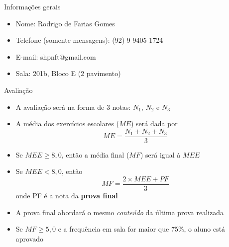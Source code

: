 \documentclass[t,%
brazilian,%
11pt,%
aspectratio=169,%
table%
]{beamer}
\title{\Disciplina}
\author{\Professor}
\date{\Periodo}
\newcommand{\esimo}{\textordmasculine }
\begin{document}
\begin{frame}
    \titlepage
\end{frame}

\begin{frame}{Informações gerais}
    \begin{itemize}
        \item Nome: {\selectfont Rodrigo de Farias Gomes}
        \item Telefone (somente mensagens): (92) 9 9405-1724
        \item E-mail: shpnft@gmail.com
        \item Sala: 201b, Bloco E (2\esimo{} pavimento)
    \end{itemize}
\end{frame}

\begin{frame}{Avaliação}
    \begin{itemize}
        \item A avaliação será na forma de 3 notas: \(N_1\), \(N_2\) e \(N_3\)
        \item A média dos exercícios escolares (\(ME\)) será dada por
            \[
                ME=\frac{N_1+N_2+N_3}{3}
            \]
        \item Se \(MEE \geq 8,0\), então a média final (\(MF\)) será igual à \(MEE\)
        \item Se \(MEE < 8,0\), então
            \[
                MF=\frac{2\times MEE+PF}{3}
            \]
            onde PF é a nota da \textbf{prova final}
        \item A prova final abordará o mesmo \textit{conteúdo} da última prova realizada
        \item Se \(MF \geq 5,0\) e a frequência em sala for maior que 75\%, o aluno está aprovado
    \end{itemize}
\end{frame}
\end{document}
